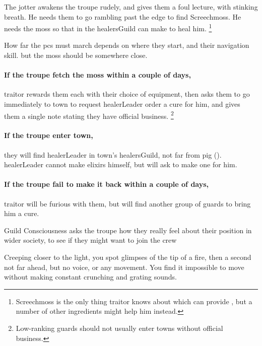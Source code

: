 \noindent
The \gls{jotter} awakens the troupe rudely, and gives them a foul lecture, with stinking breath.
He needs them to go \gls{rambling} past the \gls{edge} to find Screechmoss.%
He needs the moss so that  in the \gls{healersGuild} can make  to heal him.%
\footnote{Screechmoss is the only thing \gls{traitor} knows about which can provide , but a number of other \glspl{ingredient} might help him instead.}

How far the \glspl{pc} must march depends on where they start, and their \gls{navigation} skill.%
but the moss should be somewhere close.

\paragraph{If the troupe fetch the moss within a couple of days,}
\gls{traitor} rewards them each with their choice of equipment, then asks them to go immediately to \gls{town} to request \gls{healerLeader} order a cure for him, and gives them a single note stating they have official business.%
\footnote{Low-ranking \glspl{guard} should not usually enter towns without official business.}

\paragraph{If the troupe enter \gls{town},}
they will find \gls{healerLeader} in \gls{town}'s \gls{healersGuild}, not far from \gls{pig} ().
\gls{healerLeader} cannot make \glspl{elixir} himself, but will ask  to make one for him.

\paragraph{If the troupe fail to make it back within a couple of days,}
\gls{traitor} will be furious with them, but will find another group of \glspl{guard} to bring him a cure.

{Guild Consciousness}%
{ asks the troupe how they really feel about their position in wider society, to see if they might want to join the  crew}%

\begin{boxtext}
  Creeping closer to the light, you spot glimpses of the tip of a fire, then a second not far ahead, but no voice, or any movement.
  You find it impossible to move without making constant crunching and grating sounds.
\end{boxtext}

